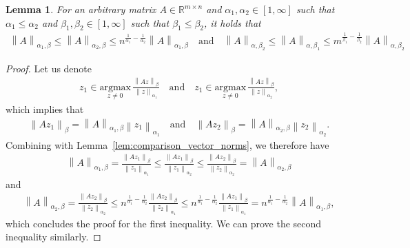 \documentclass{article}
\newtheorem{lemma}{Lemma}
\theoremstyle{remark}
\newcommand{\Norm}[1]{\left\|#1\right\|}
\newcommand{\argmax}[1]{\underset{ #1 }{\mathrm{argmax}}\, }
\newcommand{\RR}{\mathbb{R}}
\begin{document}
\begin{lemma}\label{lem:comparing_matrix_norms}
    For an arbitrary matrix $A \in \RR^{m\times n}$ and $\alpha_1,\alpha_2 \in [1,\infty]$ such that $\alpha_1 \le \alpha_2$ and $\beta_1,\beta_2 \in [1,\infty]$ such that $\beta_1 \le \beta_2$, it holds that
    \begin{align*}
        \Norm{A}_{\alpha_1,\beta} \le \Norm{A}_{\alpha_2,\beta} \le n^{\frac{1}{\alpha_1} - \frac{1}{\alpha_2}} \Norm{A}_{\alpha_1,\beta} 
        \quad \mathrm{and} \quad
        \Norm{A}_{\alpha,\beta_2} \le \Norm{A}_{\alpha,\beta_1} \le m^{\frac{1}{\beta_1} - \frac{1}{\beta_2}} \Norm{A}_{\alpha,\beta_2} 
    \end{align*}
\end{lemma}
\begin{proof}
    Let us denote 
    \begin{align*}
        z_1 \in \argmax{z\neq 0} \frac{\Norm{A z}_\beta}{\Norm{z}_{\alpha_1}} \quad \mathrm{and} \quad z_1 \in \argmax{z\neq 0} \frac{\Norm{A z}_\beta}{\Norm{z}_{\alpha_2}} ,
    \end{align*}
    which implies that
    \begin{align*}
        \Norm{A z_1}_\beta = \Norm{A}_{\alpha_1, \beta} \Norm{z_1}_{\alpha_1} \quad \mathrm{and} \quad \Norm{A z_2}_\beta = \Norm{A}_{\alpha_2, \beta} \Norm{z_2}_{\alpha_2} .
    \end{align*}
    Combining with Lemma~\ref{lem:comparison_vector_norms}, we therefore have
    \begin{align*}
        \Norm{A}_{\alpha_1, \beta} = \frac{\Norm{A z_1}_\beta}{\Norm{z_1}_{\alpha_1}} \le \frac{\Norm{A z_1}_\beta}{\Norm{z_1}_{\alpha_2}} \le \frac{\Norm{A z_2}_\beta}{\Norm{z_2}_{\alpha_2}} = \Norm{A}_{\alpha_2, \beta} 
    \end{align*}
    and
    \begin{align*}
        \Norm{A}_{\alpha_2, \beta} = \frac{\Norm{A z_2}_\beta}{\Norm{z_2}_{\alpha_2}} \le n^{\frac{1}{\alpha_1} - \frac{1}{\alpha_2}} \frac{\Norm{A z_2}_\beta}{\Norm{z_2}_{\alpha_1}} \le n^{\frac{1}{\alpha_1} - \frac{1}{\alpha_2}} \frac{\Norm{A z_1}_\beta}{\Norm{z_1}_{\alpha_1}} = n^{\frac{1}{\alpha_1} - \frac{1}{\alpha_2}} \Norm{A}_{\alpha_1, \beta} ,
    \end{align*}
    which concludes the proof for the first inequality. We can prove the second inequality similarly.
\end{proof}
\end{document}
